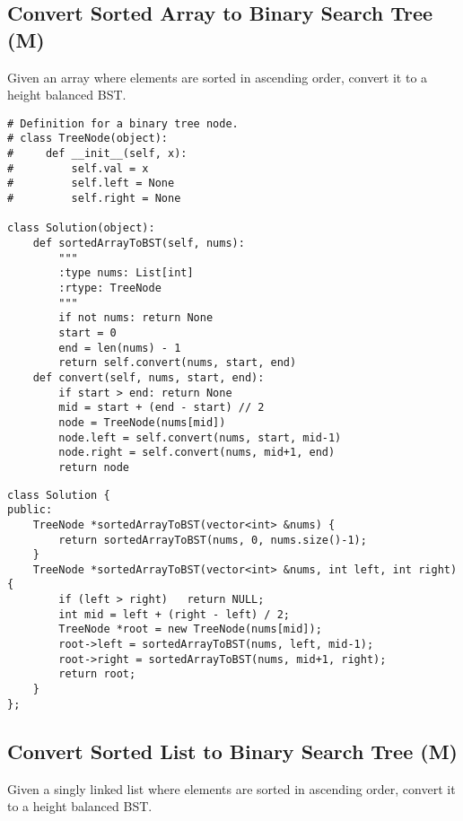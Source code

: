 \subsection{Convert Sorted Array to Binary Search Tree (M)}
Given an array where elements are sorted in ascending order, convert it to a height balanced BST.\\

\begin{lstlisting}
# Definition for a binary tree node.
# class TreeNode(object):
#     def __init__(self, x):
#         self.val = x
#         self.left = None
#         self.right = None

class Solution(object):
    def sortedArrayToBST(self, nums):
        """
        :type nums: List[int]
        :rtype: TreeNode
        """
        if not nums: return None
        start = 0
        end = len(nums) - 1
        return self.convert(nums, start, end)
    def convert(self, nums, start, end):
        if start > end: return None
        mid = start + (end - start) // 2
        node = TreeNode(nums[mid])
        node.left = self.convert(nums, start, mid-1)
        node.right = self.convert(nums, mid+1, end)
        return node
\end{lstlisting}

\begin{lstlisting}
class Solution {
public:
    TreeNode *sortedArrayToBST(vector<int> &nums) {
        return sortedArrayToBST(nums, 0, nums.size()-1);
    }
    TreeNode *sortedArrayToBST(vector<int> &nums, int left, int right) {
        if (left > right)   return NULL;
        int mid = left + (right - left) / 2;
        TreeNode *root = new TreeNode(nums[mid]);
        root->left = sortedArrayToBST(nums, left, mid-1);
        root->right = sortedArrayToBST(nums, mid+1, right);
        return root;
    }
};
\end{lstlisting}


\subsection{Convert Sorted List to Binary Search Tree (M)}
Given a singly linked list where elements are sorted in ascending order, convert it to a height balanced BST.\\

